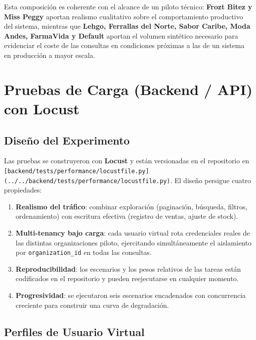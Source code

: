 Esta composición es coherente con el alcance de un piloto técnico: \textbf{Frozt Bitez y Miss Peggy} aportan realismo cualitativo sobre el comportamiento productivo del sistema, mientras que \textbf{Lehgo, Ferrallas del Norte, Sabor Caribe, Moda Andes, FarmaVida y Default} aportan el volumen sintético necesario para evidenciar el coste de las consultas en condiciones próximas a las de un sistema en producción a mayor escala.

\section{Pruebas de Carga (Backend / API) con Locust}\label{pruebas-de-carga-backend-api-con-locust}

\subsection{Diseño del Experimento}\label{diseuxf1o-del-experimento}

Las pruebas se construyeron con \textbf{Locust} y están versionadas en el repositorio en \texttt{{[}backend/tests/performance/locustfile.py{]}(../../backend/tests/performance/locustfile.py)}. El diseño persigue cuatro propiedades:

\begin{enumerate}
\def\labelenumi{\arabic{enumi}.}
\tightlist
\item
  \textbf{Realismo del tráfico}: combinar exploración (paginación, búsqueda, filtros, ordenamiento) con escritura efectiva (registro de ventas, ajuste de stock).
\item
  \textbf{Multi-tenancy bajo carga}: cada usuario virtual rota credenciales reales de las distintas organizaciones piloto, ejercitando simultáneamente el aislamiento por \texttt{organization\_id} en todas las consultas.
\item
  \textbf{Reproducibilidad}: los escenarios y los pesos relativos de las tareas están codificados en el repositorio y pueden reejecutarse en cualquier momento.
\item
  \textbf{Progresividad}: se ejecutaron seis escenarios encadenados con concurrencia creciente para construir una curva de degradación.
\end{enumerate}

\subsection{Perfiles de Usuario Virtual}\label{perfiles-de-usuario-virtual}

